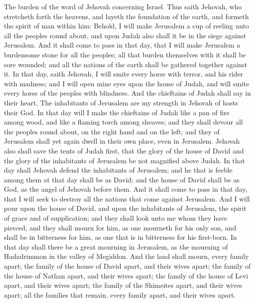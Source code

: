 The burden of the word of Jehovah concerning Israel. Thus saith Jehovah, who stretcheth forth the heavens, and layeth the foundation of the earth, and formeth the spirit of man within him: Behold, I will make Jerusalem a cup of reeling unto all the peoples round about, and upon Judah also shall it be in the siege against Jerusalem. And it shall come to pass in that day, that I will make Jerusalem a burdensome stone for all the peoples; all that burden themselves with it shall be sore wounded; and all the nations of the earth shall be gathered together against it. In that day, saith Jehovah, I will smite every horse with terror, and his rider with madness; and I will open mine eyes upon the house of Judah, and will smite every horse of the peoples with blindness. And the chieftains of Judah shall say in their heart, The inhabitants of Jerusalem are my strength in Jehovah of hosts their God. In that day will I make the chieftains of Judah like a pan of fire among wood, and like a flaming torch among sheaves; and they shall devour all the peoples round about, on the right hand and on the left; and they of Jerusalem shall yet again dwell in their own place, even in Jerusalem. Jehovah also shall save the tents of Judah first, that the glory of the house of David and the glory of the inhabitants of Jerusalem be not magnified above Judah. In that day shall Jehovah defend the inhabitants of Jerusalem; and he that is feeble among them at that day shall be as David; and the house of David shall be as God, as the angel of Jehovah before them. And it shall come to pass in that day, that I will seek to destroy all the nations that come against Jerusalem.  And I will pour upon the house of David, and upon the inhabitants of Jerusalem, the spirit of grace and of supplication; and they shall look unto me whom they have pierced; and they shall mourn for him, as one mourneth for his only son, and shall be in bitterness for him, as one that is in bitterness for his first-born. In that day shall there be a great mourning in Jerusalem, as the mourning of Hadadrimmon in the valley of Megiddon. And the land shall mourn, every family apart; the family of the house of David apart, and their wives apart; the family of the house of Nathan apart, and their wives apart; the family of the house of Levi apart, and their wives apart; the family of the Shimeites apart, and their wives apart; all the families that remain, every family apart, and their wives apart. 

